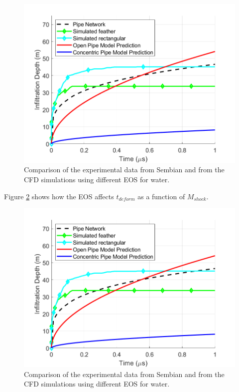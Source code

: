 \documentclass{UCF_ETD}
\begin{document}
\begin{figure}
\centering
\includegraphics[width=\textwidth]{Figures/EOS_drop_shape.png}
\caption{Comparison of the experimental data from Sembian \cite{Sembian} and from the CFD simulations using different EOS for water.}
\label{fig:EOS_ellipticity}
\end{figure}

Figure \ref{fig:EOS_deform} shows how the EOS affects $t_{deform}$ as a function of $M_{shock}$.

\begin{figure}
\centering
\includegraphics[width=\textwidth]{Figures/EOS_drop_shape.png}
\caption{Comparison of the experimental data from Sembian \cite{Sembian} and from the CFD simulations using different EOS for water.}
\label{fig:EOS_deform}
\end{figure}
\end{document}

